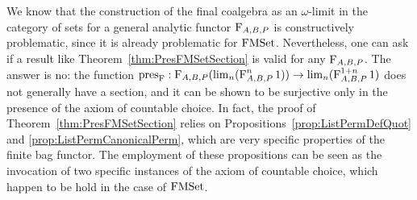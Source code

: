 \documentclass[a4paper,USenglish,cleveref]{lipics-v2021}
\begin{document}
We know that the construction of the final coalgebra as an $\omega$-limit in the category of sets for a general analytic functor $\Op{F}_{A,B,P}$ is constructively problematic, since it is already problematic for $\FMSet$. Nevertheless, one can ask if a result like Theorem~\ref{thm:PresFMSetSection} is valid for any $\Op{F}_{A,B,P}$. The answer is no: the function $\pres{\Op{F}} : \Op{F}_{A,B,P} (\lim_{n} (\Op{F}_{A,B,P}^n 1)) \to \lim_{n} (\Op{F}_{A,B,P}^{1 + n} 1)$ does not generally have a section, and it can be shown to be surjective only in the presence of the axiom of countable choice. In fact, the proof of Theorem~\ref{thm:PresFMSetSection} relies on Propositions~\ref{prop:ListPermDefQuot} and \ref{prop:ListPermCanonicalPerm}, which are very specific properties of the finite bag functor.
The employment of these propositions can be seen as the invocation of two specific instances of the axiom of countable choice, which happen to be hold in the case of $\FMSet$.
\end{document}
